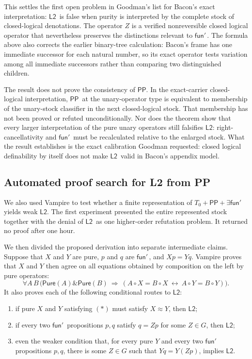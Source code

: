 \documentclass[12pt,leqno]{article}
\newcommand{\AND}{\ensuremath{\mathbin{\&}}}
\newcommand{\IFF}{\ensuremath{\leftrightarrow}}
\theoremstyle{plain}
\theoremstyle{definition}
\newcommand{\funp}{\ensuremath{\mathsf{fun}'\,}}
\newcommand{\Pure}{\ensuremath{\mathsf{Pure}}}
\newcommand{\PP}{\ensuremath{\mathsf{PP}}}
\newcommand{\Ltwo}{\ensuremath{\mathsf{L2}}}
\begin{document}
This settles the first open problem in Goodman's list for Bacon's exact
interpretation: \Ltwo\ is false when purity is interpreted by the complete
stock of closed-logical denotations.  The operator \(Z\) is a verified
nonreversible closed logical operator that nevertheless preserves the
distinctions relevant to \(\funp\).  The formula above also corrects the
earlier binary-tree calculation: Bacon's frame has one immediate successor
for each natural number, so its exact operator tests variation among all
immediate successors rather than comparing two distinguished children.

The result does not prove the consistency of \PP.  In the exact-carrier
closed-logical interpretation, \PP\ at the unary-operator type is equivalent
to membership of the unary-stock classifier in the next closed-logical
stock.  That membership has not been proved or refuted unconditionally.  Nor does the theorem show that
every larger interpretation of the pure unary operators still falsifies
\Ltwo: right-cancellativity and \(\funp\) must be recalculated relative to
the enlarged stock.  What the result establishes is the exact calibration
Goodman requested: closed logical definability by itself does not make
\Ltwo\ valid in Bacon's appendix model.

\subsection{Automated proof search for L2 from PP}

We also used Vampire to test whether a finite representation of
\(T_0+\PP+\exists\funp\) yields weak \Ltwo.  The first experiment presented
the entire represented stock together with the denial of \Ltwo\ as one
higher-order refutation problem.  It returned no proof after one hour.

We then divided the proposed derivation into separate intermediate claims.
Suppose that \(X\) and \(Y\) are pure, \(p\) and \(q\) are \(\funp\), and
\(Xp=Yq\).  Vampire proves that \(X\) and \(Y\) then agree on all equations
obtained by composition on the left by pure operators:
\[
 \forall A\,B\,
 \bigl(
   \Pure(A)\AND\Pure(B)
   \ \Longrightarrow\
   (A\circ X=B\circ X\ \IFF\ A\circ Y=B\circ Y)
 \bigr).
\tag{*}
\]
It also proves each of the following conditional routes to \Ltwo:
\begin{enumerate}
\item if pure \(X\) and \(Y\) satisfying \((*)\) must satisfy
      \(X\approx Y\), then \Ltwo;
\item if every two \(\funp\) propositions \(p,q\) satisfy
      \(q=Zp\) for some \(Z\in G\), then \Ltwo;
\item even the weaker condition that, for every pure \(Y\) and every two
      \(\funp\) propositions \(p,q\), there is some \(Z\in G\) such that
      \(Yq=Y(Zp)\), implies \Ltwo.
\end{enumerate}
\end{document}
